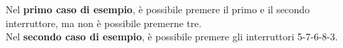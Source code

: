 \Examples
\begin{example}
%
\end{example}
\begin{example}
%
\end{example}


\Explanation
Nel \textbf{primo caso di esempio}, è possibile premere il primo e il secondo interruttore, ma non è possibile premerne tre.\\[2mm]
Nel \textbf{secondo caso di esempio}, è possibile premere gli interruttori 5-7-6-8-3.
